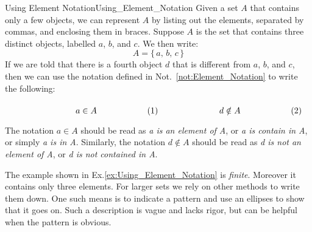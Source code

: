     \begin{lexample}{Using Element Notation}{Using_Element_Notation}
        Given a set $A$ that contains only a few objects, we can represent
        $A$ by listing out the elements, separated by commas, and enclosing
        them in braces. Suppose $A$ is the set that contains three distinct
        objects, labelled $a$, $b$, and $c$. We then write:
        \begin{equation}
            A=\{\,a,\,b,\,c\,\}
        \end{equation}
        If we are told that there is a fourth object $d$ that is different
        from $a$, $b$, and $c$, then we can use the notation defined in
        Not.~\ref{not:Element_Notation} to write the following:
        \par\hfill\par
        \begin{subequations}
            \begin{minipage}[b]{0.49\textwidth}
                \begin{equation}
                    a\in{A}
                \end{equation}
            \end{minipage}
            \hfill
            \begin{minipage}[b]{0.49\textwidth}
                \begin{equation}
                    d\notin{A}
                \end{equation}
            \end{minipage}
        \end{subequations}
        \par\vspace{2.5ex}
        The notation $a\in{A}$ should be read as \textit{a is an element of A},
        or \textit{a is contain in A}, or simply \textit{a is in A}. Similarly,
        the notation $d\notin{A}$ should be read as
        \textit{d is not an element of A}, or \textit{d is not contained in A}.
    \end{lexample}
    The example shown in Ex.\ref{ex:Using_Element_Notation} is
    \textit{finite}. Moreover it contains only three elements. For larger sets
    we rely on other methods to write them down. One such means is to indicate
    a pattern and use an ellipses to show that it goes on. Such a description
    is vague and lacks rigor, but can be helpful when the pattern is obvious.
